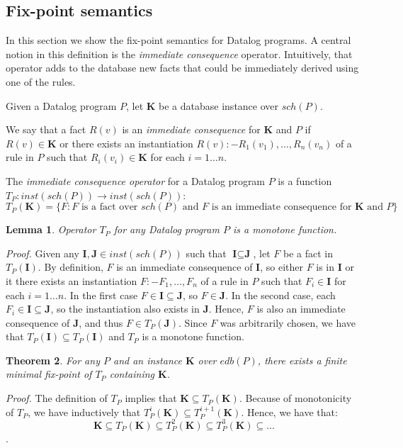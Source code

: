 \documentclass{pracamgr}
\theoremstyle{plain}
\newtheorem{thm}{Theorem}[section]
\newtheorem{lem}[thm]{Lemma}
\theoremstyle{definition}
\theoremstyle{remark}
\begin{document}
\subsection{Fix-point semantics}
In this section we show the fix-point semantics for Datalog programs. A central notion in this definition is the \emph{immediate consequence} operator. Intuitively, that operator adds to the database new facts that could be immediately derived using one of the rules.

Given a Datalog program $P$, let $\textbf{K}$ be a database instance over $sch(P)$.

We say that a fact $R(v)$ is an \emph{immediate consequence} for $\textbf{K}$ and $P$ if $R(v) \in \textbf{K}$ or there exists an instantiation $R(v) :- R_1(v_1), \dots, R_n(v_n)$ of a rule in $P$ such that $R_i(v_i) \in \textbf{K}$ for each $i = 1\dots n$.

The \emph{immediate consequence operator} for a Datalog program $P$ is a function $T_P: inst(sch(P)) \to inst(sch(P))$:
$$T_P(\textbf{K}) = \{ F: F \text{ is a fact over } sch(P) \text{ and $F$ is an immediate consequence for } \textbf{K} \text{ and } P \}$$

\begin{lem}
Operator $T_P$ for any Datalog program $P$ is a monotone function.
\end{lem}
\emph{Proof.} Given any $\textbf{I}, \textbf{J} \in inst(sch(P))$ such that $\textbf{I} \subseteq \textbf{J}$, let $F$ be a fact in $T_P(\textbf{I})$.
By definition, $F$ is an immediate consequence of $\textbf{I}$, so either $F$ is in $\textbf{I}$ or it there exists an instantiation
 $F :- F_1, \dots, F_n$ of a rule in $P$ such that $F_i \in \textbf{I}$ for each $i = 1\dots n$. 
In the first case $F \in \textbf{I} \subseteq \textbf{J}$, so $F \in \textbf{J}$. 
In the second case, each $F_i \in \textbf{I} \subseteq \textbf{J}$, so the instantiation also exists in $\textbf{J}$. 
Hence, $F$ is also an immediate consequence of $\textbf{J}$, and thus $F \in T_P(\textbf{J})$. 
Since $F$ was arbitrarily chosen, we have that $T_P(\textbf{I}) \subseteq T_P(\textbf{I})$ and $T_P$ is a monotone function.

\begin{thm}
For any $P$ and an instance $\textbf{K}$ over $edb(P)$, there exists a finite minimal fix-point of $T_P$ containing $\textbf{K}$.
\end{thm}\label{t:datalogfixpointsem}
\emph{Proof.}
The definition of $T_P$ implies that $\textbf{K} \subseteq T_P(\textbf{K})$.
Because of monotonicity of $T_P$, we have inductively that $T_P^i(\textbf{K}) \subseteq T_P^{i+1}(\textbf{K})$.
Hence, we have that:
$$\textbf{K} \subseteq T_P(\textbf{K}) \subseteq T_P^2(\textbf{K}) \subseteq T_P^3(\textbf{K}) \subseteq \dots$$.
\end{document}

